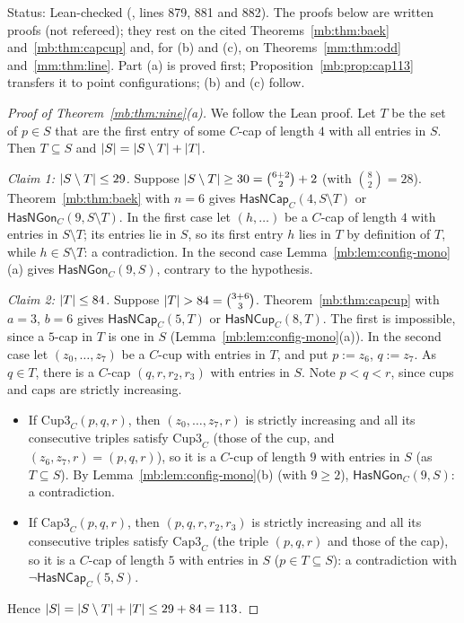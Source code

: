 Status: Lean-checked (, lines 879, 881 and 882). The proofs below are written proofs
(not refereed); they rest on the cited Theorems~\ref{mb:thm:baek} and~\ref{mb:thm:capcup} and, for (b) and (c), on
Theorems~\ref{mm:thm:odd} and~\ref{mm:thm:line}. Part (a) is proved first; Proposition~\ref{mb:prop:cap113} transfers
it to point configurations; (b) and (c) follow.

\begin{proof}[Proof of Theorem~\ref{mb:thm:nine}(a)]
We follow the Lean proof. Let $T$ be the set of $p\in S$ that are the first entry of some $C$-cap of length $4$ with all
entries in $S$. Then $T\subseteq S$ and $\lvert S\rvert=\lvert S\setminus T\rvert+\lvert T\rvert$.

\emph{Claim 1: $\lvert S\setminus T\rvert\le29$.} Suppose $\lvert S\setminus T\rvert\ge30=\binom{6+2}{2}+2$ (with $\binom82=28$).
Theorem~\ref{mb:thm:baek} with $n=6$ gives $\mathsf{HasNCap}_C(4,S\setminus T)$ or $\mathsf{HasNGon}_C(9,S\setminus T)$.
In the first case let $(h,\dots)$ be a $C$-cap of length $4$ with entries in $S\setminus T$; its entries lie in $S$, so
its first entry $h$ lies in $T$ by definition of $T$, while $h\in S\setminus T$: a contradiction. In the second case
Lemma~\ref{mb:lem:config-mono}(a) gives $\mathsf{HasNGon}_C(9,S)$, contrary to the hypothesis.

\emph{Claim 2: $\lvert T\rvert\le84$.} Suppose $\lvert T\rvert>84=\binom{3+6}{3}$. Theorem~\ref{mb:thm:capcup} with $a=3$, $b=6$ gives
$\mathsf{HasNCap}_C(5,T)$ or $\mathsf{HasNCup}_C(8,T)$. The first is impossible, since a $5$-cap in $T$ is one in $S$
(Lemma~\ref{mb:lem:config-mono}(a)). In the second case let $(z_0,\dots,z_7)$ be a $C$-cup with entries in $T$, and put
$p:=z_6$, $q:=z_7$. As $q\in T$, there is a $C$-cap $(q,r,r_2,r_3)$ with entries in $S$. Note $p<q<r$, since cups and
caps are strictly increasing.
\begin{itemize}
\item If $\mathrm{Cup3}_C(p,q,r)$, then $(z_0,\dots,z_7,r)$ is strictly increasing and all its consecutive triples
  satisfy $\mathrm{Cup3}_C$ (those of the cup, and $(z_6,z_7,r)=(p,q,r)$), so it is a $C$-cup of length $9$ with entries
  in $S$ (as $T\subseteq S$). By Lemma~\ref{mb:lem:config-mono}(b) (with $9\ge2$), $\mathsf{HasNGon}_C(9,S)$: a
  contradiction.
\item If $\mathrm{Cap3}_C(p,q,r)$, then $(p,q,r,r_2,r_3)$ is strictly increasing and all its consecutive triples satisfy
  $\mathrm{Cap3}_C$ (the triple $(p,q,r)$ and those of the cap), so it is a $C$-cap of length $5$ with entries in $S$
  ($p\in T\subseteq S$): a contradiction with $\neg\mathsf{HasNCap}_C(5,S)$.
\end{itemize}

Hence $\lvert S\rvert=\lvert S\setminus T\rvert+\lvert T\rvert\le29+84=113$.
\end{proof}


